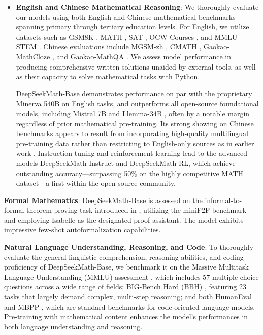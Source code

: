 \begin{itemize}[topsep=0pt]
    \item \textbf{English and Chinese Mathematical Reasoning}: We thoroughly evaluate our models using both English and Chinese mathematical benchmarks spanning primary through tertiary education levels. For English, we utilize datasets such as GSM8K \citep{gsm8k}, MATH \citep{MATH}, SAT \citep{llemma}, OCW Courses \citep{minerva}, and MMLU-STEM \citep{mmlu}. Chinese evaluations include MGSM-zh \citep{mgsm}, CMATH \citep{wei2023cmath}, Gaokao-MathCloze \citep{agieval}, and Gaokao-MathQA \citep{agieval}. We assess model performance in producing comprehensive written solutions unaided by external tools, as well as their capacity to solve mathematical tasks with Python.

    DeepSeekMath-Base demonstrates performance on par with the proprietary Minerva 540B \citep{minerva} on English tasks, and outperforms all open-source foundational models, including Mistral 7B \citep{mistral} and Llemma-34B \citep{llemma}, often by a notable margin regardless of prior mathematical pre-training. Its strong showing on Chinese benchmarks appears to result from incorporating high-quality multilingual pre-training data rather than restricting to English-only sources as in earlier work \citep{minerva,llemma}. Instruction-tuning and reinforcement learning lead to the advanced models DeepSeekMath-Instruct and DeepSeekMath-RL, which achieve outstanding accuracy—surpassing 50\% on the highly competitive MATH dataset—a first within the open-source community.
\end{itemize}

\item \textbf{Formal Mathematics}: DeepSeekMath-Base is assessed on the informal-to-formal theorem proving task introduced in \citep{dsp_proof}, utilizing the miniF2F benchmark \citep{minif2f} and employing Isabelle \citep{isabelle} as the designated proof assistant. The model exhibits impressive few-shot autoformalization capabilities.

\item \textbf{Natural Language Understanding, Reasoning, and Code}: To thoroughly evaluate the general linguistic comprehension, reasoning abilities, and coding proficiency of DeepSeekMath-Base, we benchmark it on the Massive Multitask Language Understanding (MMLU) assessment \citep{mmlu}, which includes 57 multiple-choice questions across a wide range of fields; BIG-Bench Hard (BBH) \citep{bbh}, featuring 23 tasks that largely demand complex, multi-step reasoning; and both HumanEval \citep{codex} and MBPP \citep{mbpp}, which are standard benchmarks for code-oriented language models. Pre-training with mathematical content enhances the model’s performances in both language understanding and reasoning.

